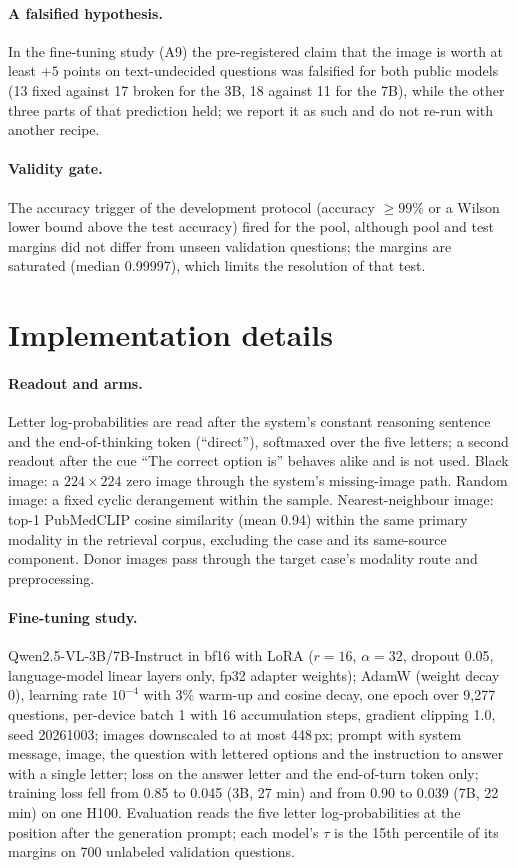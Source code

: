 \paragraph{A falsified hypothesis.}
In the fine-tuning study (A9) the pre-registered claim that the image is worth at least $+5$ points on text-undecided questions was falsified for both public models (13 fixed against 17 broken for the 3B, 18 against 11 for the 7B), while the other three parts of that prediction held; we report it as such and do not re-run with another recipe.

\paragraph{Validity gate.}
The accuracy trigger of the development protocol (accuracy $\ge99\%$ or a Wilson lower bound above the test accuracy) fired for the pool, although pool and test margins did not differ from unseen validation questions; the margins are saturated (median 0.99997), which limits the resolution of that test.

\section{Implementation details}
\label{app:impl}

\paragraph{Readout and arms.}
Letter log-probabilities are read after the system's constant reasoning sentence and the end-of-thinking token (``direct''), softmaxed over the five letters; a second readout after the cue ``The correct option is'' behaves alike and is not used.
Black image: a $224\times224$ zero image through the system's missing-image path.
Random image: a fixed cyclic derangement within the sample.
Nearest-neighbour image: top-1 PubMedCLIP cosine similarity (mean 0.94) within the same primary modality in the retrieval corpus, excluding the case and its same-source component.
Donor images pass through the target case's modality route and preprocessing.

\paragraph{Fine-tuning study.}
Qwen2.5-VL-3B/7B-Instruct in bf16 with LoRA ($r=16$, $\alpha=32$, dropout 0.05, language-model linear layers only, fp32 adapter weights); AdamW (weight decay 0), learning rate $10^{-4}$ with 3\% warm-up and cosine decay, one epoch over 9{,}277 questions, per-device batch 1 with 16 accumulation steps, gradient clipping 1.0, seed 20261003; images downscaled to at most 448\,px; prompt with system message, image, the question with lettered options and the instruction to answer with a single letter; loss on the answer letter and the end-of-turn token only; training loss fell from 0.85 to 0.045 (3B, 27 min) and from 0.90 to 0.039 (7B, 22 min) on one H100.
Evaluation reads the five letter log-probabilities at the position after the generation prompt; each model's $\tau$ is the 15th percentile of its margins on 700 unlabeled validation questions.


